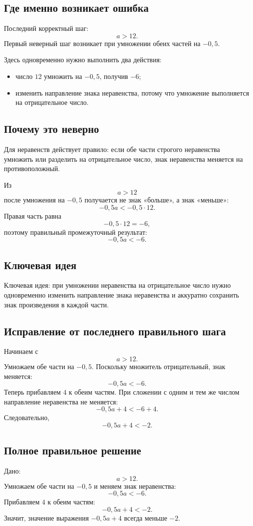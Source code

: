 \documentclass[12pt,a4paper]{article}
\newcommand{\keyidea}{\textcolor{blue!60!black}{Ключевая идея:}}
\begin{document}
\subsection*{Где именно возникает ошибка}
Последний корректный шаг:
\[
a>12.
\]
Первый неверный шаг возникает при умножении обеих частей на $-0{,}5$.

Здесь одновременно нужно выполнить два действия:
\begin{itemize}
\item число $12$ умножить на $-0{,}5$, получив $-6$;
\item изменить направление знака неравенства, потому что умножение выполняется на отрицательное число.
\end{itemize}

\subsection*{Почему это неверно}
Для неравенств действует правило: если обе части строгого неравенства умножить или разделить на отрицательное число, знак неравенства меняется на противоположный.

Из
\[
a>12
\]
после умножения на $-0{,}5$ получается не знак «больше», а знак «меньше»:
\[
-0{,}5a<-0{,}5\cdot 12.
\]
Правая часть равна
\[
-0{,}5\cdot 12=-6,
\]
поэтому правильный промежуточный результат:
\[
-0{,}5a<-6.
\]

\subsection*{Ключевая идея}
\keyidea{} при умножении неравенства на отрицательное число нужно одновременно изменить направление знака неравенства и аккуратно сохранить знак произведения в каждой части.

\subsection*{Исправление от последнего правильного шага}
Начинаем с
\[
a>12.
\]
Умножаем обе части на $-0{,}5$. Поскольку множитель отрицательный, знак меняется:
\[
-0{,}5a<-6.
\]
Теперь прибавляем $4$ к обеим частям. При сложении с одним и тем же числом направление неравенства не меняется:
\[
-0{,}5a+4<-6+4.
\]
Следовательно,
\[
-0{,}5a+4<-2.
\]

\subsection*{Полное правильное решение}
Дано:
\[
a>12.
\]
Умножаем обе части на $-0{,}5$ и меняем знак неравенства:
\[
-0{,}5a<-6.
\]
Прибавляем $4$ к обеим частям:
\[
-0{,}5a+4<-2.
\]
Значит, значение выражения $-0{,}5a+4$ всегда меньше $-2$.
\end{document}
